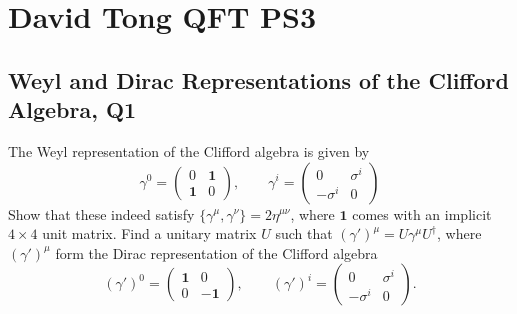 \section{David Tong QFT PS3}
\subsection{Weyl and Dirac Representations of the Clifford Algebra, Q1}

The Weyl representation of the Clifford algebra is given by
\begin{equation}
    \gamma^0 = \begin{pmatrix} 0 & \mathbf{1} \\ \mathbf{1} & 0 \end{pmatrix}, \qquad
    \gamma^i = \begin{pmatrix} 0 & \sigma^i \\ -\sigma^i & 0 \end{pmatrix}
\end{equation}
Show that these indeed satisfy $\{\gamma^\mu, \gamma^\nu\} = 2\eta^{\mu\nu}$, where $\mathbf{1}$ comes with an implicit $4\times 4$ unit matrix. Find a unitary matrix $U$ such that $(\gamma')^\mu = U\gamma^\mu U^\dagger$, where $(\gamma')^\mu$ form the Dirac representation of the Clifford algebra
\begin{equation}
    (\gamma')^0 = \begin{pmatrix} \mathbf{1} & 0 \\ 0 & -\mathbf{1} \end{pmatrix}, \qquad
    (\gamma')^i = \begin{pmatrix} 0 & \sigma^i \\ -\sigma^i & 0 \end{pmatrix}.
\end{equation}
